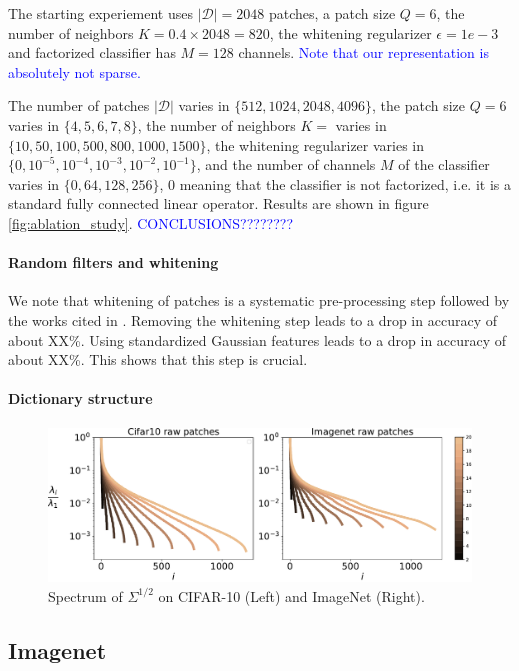 \documentclass{article}
\newcommand{\Edouard}[1]{\textcolor{blue}{#1}}
\begin{document}
The starting experiement uses  $|\mathcal{D}|=2048$ patches, a patch size $Q=6$, the number of neighbors $K=0.4\times 2048 = 820$, the whitening regularizer $\epsilon=1e-3$ and factorized classifier has $M=128$ channels. \Edouard{Note that our representation is absolutely not sparse.}


The number of patches $|\mathcal{D}|$ varies in $\lbrace 512, 1024, 2048, 4096 \rbrace$, the patch size $Q=6$ varies in $\lbrace 4, 5, 6, 7, 8 \rbrace$, the number of neighbors $K=$ varies in $\lbrace 10, 50, 100, 500, 800, 1000, 1500 \rbrace$, the whitening regularizer varies in $\lbrace0, 10^{-5}, 10^{-4}, 10^{-3}, 10^{-2}, 10^{-1}\rbrace$, and the number of channels $M$ of the classifier varies in $\lbrace 0, 64, 128 ,256 \rbrace$, $0$ meaning that the classifier is not factorized, i.e. it is a standard fully connected linear operator.
Results are shown in figure \ref{fig:ablation_study}. \Edouard{CONCLUSIONS????????}

\paragraph{Random filters and whitening} We note that whitening of patches is a systematic pre-processing step followed by the works cited in \cite{}. Removing the whitening step leads to a drop in accuracy of about XX\%. Using standardized Gaussian features leads to a drop in accuracy of about XX\%. This shows that this step is crucial.

\paragraph{Dictionary structure}


\begin{figure}
  \includegraphics[width=1.\linewidth]{figures/spectrum_patches}
  \caption{Spectrum of $\Sigma^{1/2}$ on CIFAR-10 (Left) and ImageNet (Right).\label{dico}}
\end{figure}
\subsection{Imagenet}
\end{document}

